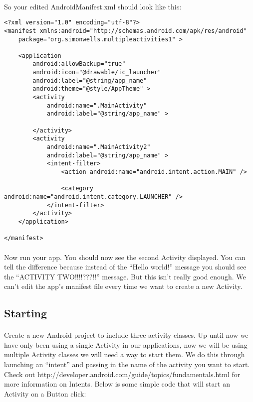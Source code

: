 \paragraph{} So your edited AndroidManifest.xml should look like this:

\begin{lstlisting}
<?xml version="1.0" encoding="utf-8"?>
<manifest xmlns:android="http://schemas.android.com/apk/res/android"
    package="org.simonwells.multipleactivities1" >

    <application
        android:allowBackup="true"
        android:icon="@drawable/ic_launcher"
        android:label="@string/app_name"
        android:theme="@style/AppTheme" >
        <activity
            android:name=".MainActivity"
            android:label="@string/app_name" >

        </activity>
        <activity
            android:name=".MainActivity2"
            android:label="@string/app_name" >
            <intent-filter>
                <action android:name="android.intent.action.MAIN" />

                <category android:name="android.intent.category.LAUNCHER" />
            </intent-filter>
        </activity>
    </application>

</manifest>
\end{lstlisting}

\paragraph{} Now run your app. You should now see the second Activity displayed. You can tell the difference because instead of the ``Hello world!'' message you should see the ``ACTIVITY TWO!!!!???!!'' message. But this isn't really good enough. We can't edit the app's manifest file every time we want to create a new Activity.

\subsection{Starting}
\paragraph{} Create a new Android project to include three activity classes. Up until now we have only been using a single Activity in our applications, now we will be using multiple Activity classes we will need a way to start them. We do this through launching an “intent” and passing in the name of the activity you want to start. Check out http://developer.android.com/guide/topics/fundamentals.html for more information on Intents. Below is some simple code that will start an Activity on a Button click:

